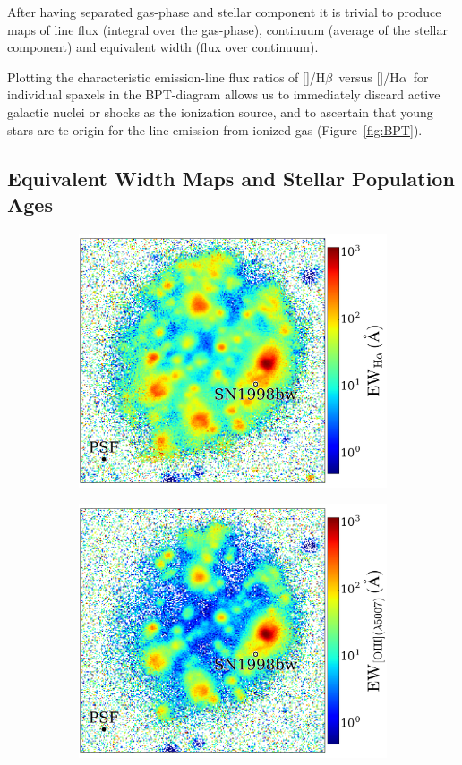 \documentclass[traditabstract]{aa}
\newcommand{\hb}{H$\beta$}
\newcommand{\ha}{H$\alpha$}
\newcommand{\oiii}{[\ion{O}{iii}]}
\newcommand{\nii}{[\ion{N}{ii}]}
\begin{document}
After having separated gas-phase and stellar component it is trivial to produce maps of line flux (integral over the gas-phase), continuum (average of the stellar component) and equivalent width (flux over continuum). 

Plotting the characteristic emission-line flux ratios of \oiii/\hb\, versus \nii/\ha\, for individual spaxels in the BPT-diagram \citep{1981PASP...93....5B} allows us to immediately discard active galactic nuclei or shocks as the ionization source, and to ascertain that young stars are te origin for the line-emission from ionized gas (Figure~\ref{fig:BPT}).
\subsection{Equivalent Width Maps and Stellar Population Ages}
\begin{figure}
\begin{subfigure}{.242\textwidth}
  \includegraphics[width=1.0\linewidth]{Figs/MUSE_SN1998bw_HaEW.pdf}
\end{subfigure}
\begin{subfigure}{.242\textwidth}
  \includegraphics[width=1.0\linewidth]{Figs/MUSE_SN1998bw_OIIIEW.pdf}

\end{subfigure}
\end{figure}
\end{document}
